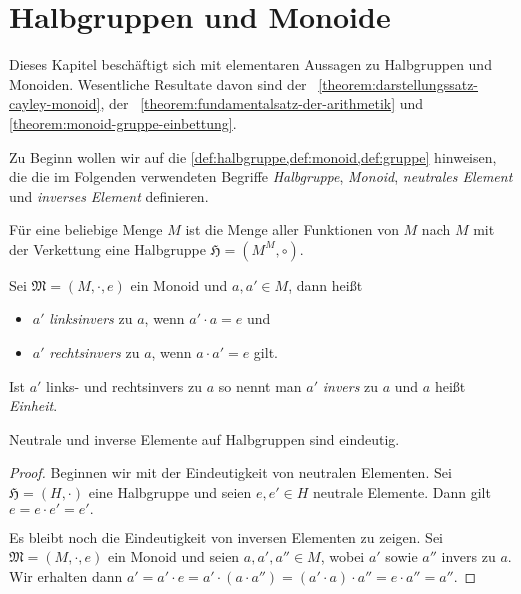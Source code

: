 \section{Halbgruppen und Monoide}
Dieses Kapitel beschäftigt sich mit elementaren Aussagen zu Halbgruppen und Monoiden. Wesentliche Resultate davon sind der ~\ref{theorem:darstellungssatz-cayley-monoid}, der ~\ref{theorem:fundamentalsatz-der-arithmetik} und \cref{theorem:monoid-gruppe-einbettung}.

Zu Beginn wollen wir auf die \cref{def:halbgruppe,def:monoid,def:gruppe} hinweisen, die die im Folgenden verwendeten Begriffe \emph{Halbgruppe}, \emph{Monoid}, \emph{neutrales Element} und \emph{inverses Element} definieren.

\begin{example}
    Für eine beliebige Menge $M$ ist die Menge aller Funktionen von $M$ nach $M$ mit der Verkettung eine Halbgruppe $\mathfrak{H} = (M^M, \circ)$.
\end{example}

\begin{definition}
    Sei $\mathfrak{M} = (M, \cdot, e)$ ein Monoid und $a, a' \in M$, dann heißt
    \begin{itemize}[topsep=0pt, label={--}]
        \item $a'$ \emph{linksinvers} zu $a$, wenn $a' \cdot a = e$ und
        \item $a'$ \emph{rechtsinvers} zu $a$, wenn $a \cdot a' = e$ gilt.
    \end{itemize}
    Ist $a'$ links- und rechtsinvers zu $a$ so nennt man $a'$ \emph{invers} zu $a$ und $a$ heißt \emph{Einheit}.
\end{definition}

\begin{lemma}
    Neutrale und inverse Elemente auf Halbgruppen sind eindeutig.
\end{lemma}

\begin{proof}
    Beginnen wir mit der Eindeutigkeit von neutralen Elementen. Sei $\mathfrak{H} = (H, \cdot)$ eine Halbgruppe und seien $e, e' \in H$ neutrale Elemente. Dann gilt $e = e \cdot e' = e'.$
    
    Es bleibt noch die Eindeutigkeit von inversen Elementen zu zeigen. Sei $\mathfrak{M} = (M, \cdot, e)$ ein Monoid und seien $a, a', a'' \in M$, wobei $a'$ sowie $a''$ invers zu $a$. Wir erhalten dann $ a' = a' \cdot e = a' \cdot (a \cdot a'') = (a' \cdot a) \cdot a'' = e \cdot a'' = a''.$
\end{proof}

